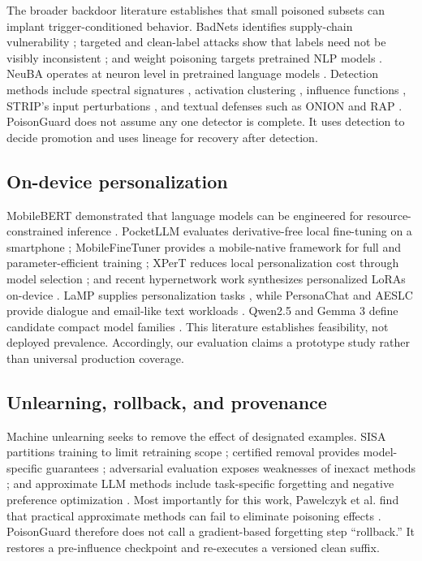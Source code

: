 The broader backdoor literature establishes that small poisoned subsets can implant trigger-conditioned behavior. BadNets identifies supply-chain vulnerability \cite{gu2017badnets}; targeted and clean-label attacks show that labels need not be visibly inconsistent \cite{chen2017targetedbackdoor,shafahi2018poisonfrogs}; and weight poisoning targets pretrained NLP models \cite{kurita2020weightpoison}. NeuBA operates at neuron level in pretrained language models \cite{zhang2021neuba}. Detection methods include spectral signatures \cite{tran2018spectral}, activation clustering \cite{chen2018activation}, influence functions \cite{koh2017influence}, STRIP's input perturbations \cite{gao2019strip}, and textual defenses such as ONION and RAP \cite{qi2020onion,yang2021rap}. PoisonGuard does not assume any one detector is complete. It uses detection to decide promotion and uses lineage for recovery after detection.

\subsection{On-device personalization}

MobileBERT demonstrated that language models can be engineered for resource-constrained inference \cite{sun2020mobilebert}. PocketLLM evaluates derivative-free local fine-tuning on a smartphone \cite{peng2024pocketllm}; MobileFineTuner provides a mobile-native framework for full and parameter-efficient training \cite{geng2025mobilefinetuner}; XPerT reduces local personalization cost through model selection \cite{wang2025xpert}; and recent hypernetwork work synthesizes personalized LoRAs on-device \cite{augenstein2026hyperlora}. LaMP supplies personalization tasks \cite{salemi2023lamp}, while PersonaChat and AESLC provide dialogue and email-like text workloads \cite{zhang2018personachat,zhang2019aeslc}. Qwen2.5 and Gemma 3 define candidate compact model families \cite{qwen2024qwen,gemma2025gemma}. This literature establishes feasibility, not deployed prevalence. Accordingly, our evaluation claims a prototype study rather than universal production coverage.

\subsection{Unlearning, rollback, and provenance}

Machine unlearning seeks to remove the effect of designated examples. SISA partitions training to limit retraining scope \cite{bourtoule2021machineunlearning}; certified removal provides model-specific guarantees \cite{guo2020certified}; adversarial evaluation exposes weaknesses of inexact methods \cite{goel2022adversarialunlearning}; and approximate LLM methods include task-specific forgetting and negative preference optimization \cite{eldan2023harry,zhang2024npo}. Most importantly for this work, Pawelczyk et al. find that practical approximate methods can fail to eliminate poisoning effects \cite{pawelczyk2025unlearning}. PoisonGuard therefore does not call a gradient-based forgetting step ``rollback.'' It restores a pre-influence checkpoint and re-executes a versioned clean suffix.

